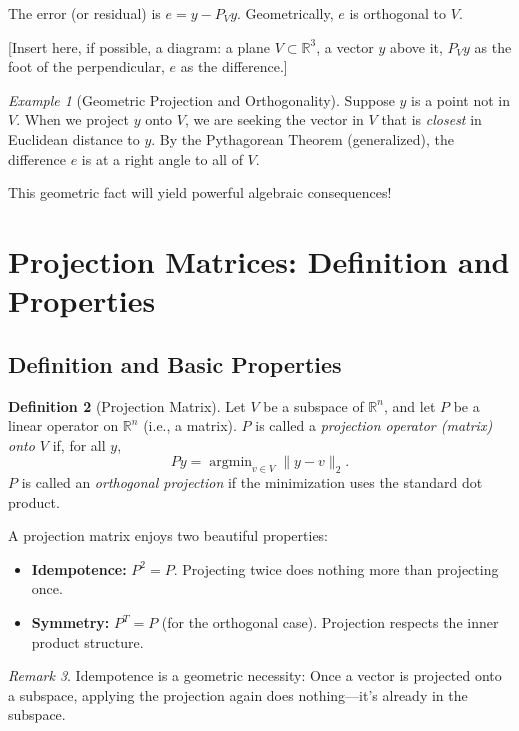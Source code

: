 \documentclass[11pt,a4paper]{article}
\theoremstyle{definition}
\newtheorem{definition}{Definition}[section]
\theoremstyle{plain}
\theoremstyle{remark}
\newtheorem{remark}[definition]{Remark}
\newtheorem{example}[definition]{Example}
\begin{document}
The error (or residual) is $e = y - P_V y$. Geometrically, $e$ is orthogonal to $V$.

\begin{center}
[Insert here, if possible, a diagram: a plane $V \subset \mathbb{R}^3$, a vector $y$ above it, $P_V y$ as the foot of the perpendicular, $e$ as the difference.]
\end{center}

\begin{example}[Geometric Projection and Orthogonality]
Suppose $y$ is a point not in $V$. When we project $y$ onto $V$, we are seeking the vector in $V$ that is \emph{closest} in Euclidean distance to $y$. By the Pythagorean Theorem (generalized), the difference $e$ is at a right angle to all of $V$.

This geometric fact will yield powerful algebraic consequences!
\end{example}

\section{Projection Matrices: Definition and Properties}

\subsection{Definition and Basic Properties}

\begin{definition}[Projection Matrix]
Let $V$ be a subspace of $\mathbb{R}^n$, and let $P$ be a linear operator on $\mathbb{R}^n$ (i.e., a matrix). $P$ is called a \emph{projection operator (matrix) onto $V$} if, for all $y$,
\[
P y = \operatorname{argmin}_{v \in V} \| y - v \|_2.
\]
$P$ is called an \emph{orthogonal projection} if the minimization uses the standard dot product.
\end{definition}

A projection matrix enjoys two beautiful properties:

\begin{itemize}
    \item \textbf{Idempotence:} $P^2 = P$. Projecting twice does nothing more than projecting once.
    \item \textbf{Symmetry:} $P^T = P$ (for the orthogonal case). Projection respects the inner product structure.
\end{itemize}

\begin{remark}
Idempotence is a geometric necessity: Once a vector is projected onto a subspace, applying the projection again does nothing—it's already in the subspace.
\end{remark}
\end{document}
